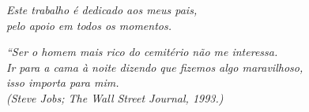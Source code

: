 \documentclass[
	12pt,				%
	openright,			%
	twoside,			%
	a4paper,			%
	english,			%
	brazil				%
	]{abntex2}
\begin{document}
\begin{dedicatoria}
    \vspace*{\fill}
    \centering
    \noindent
    \textit{ Este trabalho é dedicado aos meus pais,\\
    pelo apoio em todos os momentos.} \vspace*{\fill}
 \end{dedicatoria}


\begin{epigrafe}
    \vspace*{\fill}
	\begin{flushright}
		\textit{``Ser o homem mais rico do cemitério não me interessa.\\
		Ir para a cama à noite dizendo que fizemos algo maravilhoso, \\ isso importa para mim. \\
		(Steve Jobs; The Wall Street Journal, 1993.)}
	\end{flushright}
\end{epigrafe}
\end{document}
